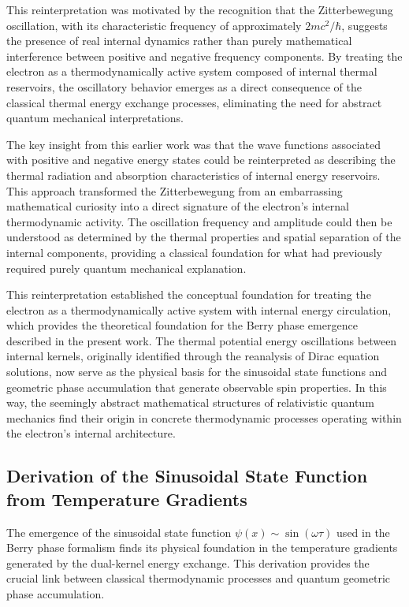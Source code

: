 \documentclass[%
 reprint,
 amsmath,amssymb,
 aps,
]{revtex4-1}
\numberwithin{equation}{section}%
\begin{document}
This reinterpretation was motivated by the recognition that the Zitterbewegung oscillation, with its characteristic frequency of approximately $2mc^2/\hbar$, suggests the presence of real internal dynamics rather than purely mathematical interference between positive and negative frequency components. By treating the electron as a thermodynamically active system composed of internal thermal reservoirs, the oscillatory behavior emerges as a direct consequence of the classical thermal energy exchange processes, eliminating the need for abstract quantum mechanical interpretations.

The key insight from this earlier work was that the wave functions associated with positive and negative energy states could be reinterpreted as describing the thermal radiation and absorption characteristics of internal energy reservoirs. This approach transformed the Zitterbewegung from an embarrassing mathematical curiosity into a direct signature of the electron's internal thermodynamic activity. The oscillation frequency and amplitude could then be understood as determined by the thermal properties and spatial separation of the internal components, providing a classical foundation for what had previously required purely quantum mechanical explanation.

This reinterpretation established the conceptual foundation for treating the electron as a thermodynamically active system with internal energy circulation, which provides the theoretical foundation for the Berry phase emergence described in the present work. The thermal potential energy oscillations between internal kernels, originally identified through the reanalysis of Dirac equation solutions, now serve as the physical basis for the sinusoidal state functions and geometric phase accumulation that generate observable spin properties. In this way, the seemingly abstract mathematical structures of relativistic quantum mechanics find their origin in concrete thermodynamic processes operating within the electron's internal architecture.


\subsection{Derivation of the Sinusoidal State Function from Temperature Gradients} \label{subsec:sinusoidal_derivation}

The emergence of the sinusoidal state function $\psi(x) \sim \sin(\omega \tau)$ used in the Berry phase formalism finds its physical foundation in the temperature gradients generated by the dual-kernel energy exchange. This derivation provides the crucial link between classical thermodynamic processes and quantum geometric phase accumulation.
\end{document}
